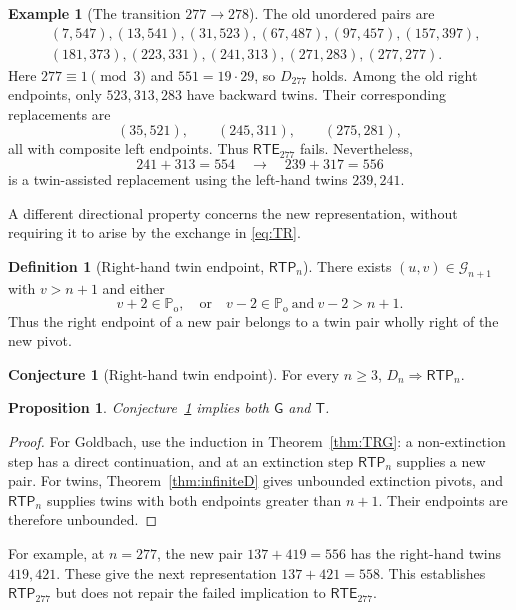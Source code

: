 \documentclass[11pt,a4paper]{article}
\newtheorem{proposition}[theorem]{Proposition}
\theoremstyle{definition}
\newtheorem{definition}[theorem]{Definition}
\newtheorem{conjecture}[theorem]{Conjecture}
\newtheorem{example}[theorem]{Example}
\theoremstyle{remark}
\newcommand{\Po}{\mathbb P_{\mathrm{o}}}
\newcommand{\G}{\mathcal G}
\newcommand{\RTE}{\mathsf{RTE}}
\newcommand{\RTP}{\mathsf{RTP}}
\newcommand{\GB}{\mathsf G}
\newcommand{\TP}{\mathsf T}
\begin{document}
\begin{example}[The transition $277\to278$]\label{ex:277}
The old unordered pairs are
\begin{align*}
 &(7,547),(13,541),(31,523),(67,487),(97,457),(157,397),\\
 &(181,373),(223,331),(241,313),(271,283),(277,277).
\end{align*}
Here $277\equiv1\pmod3$ and $551=19\cdot29$, so $D_{277}$ holds. Among the old right endpoints, only $523,313,283$ have backward twins. Their corresponding replacements are
\[
 (35,521),\qquad(245,311),\qquad(275,281),
\]
all with composite left endpoints. Thus $\RTE_{277}$ fails. Nevertheless,
\[
 241+313=554\quad\longrightarrow\quad239+317=556
\]
is a twin-assisted replacement using the left-hand twins $239,241$.
\end{example}

A different directional property concerns the new representation, without requiring it to arise by the exchange in \eqref{eq:TR}.
\begin{definition}[Right-hand twin endpoint, $\RTP_n$]
There exists $(u,v)\in\G_{n+1}$ with $v>n+1$ and either
\[
 v+2\in\Po,
 \quad\text{or}\quad
 v-2\in\Po\ \text{and}\ v-2>n+1.
\]
Thus the right endpoint of a new pair belongs to a twin pair wholly right of the new pivot.
\end{definition}

\begin{conjecture}[Right-hand twin endpoint]\label{conj:RTP}
For every $n\ge3$, $D_n\Rightarrow\RTP_n$.
\end{conjecture}

\begin{proposition}
Conjecture~\ref{conj:RTP} implies both $\GB$ and $\TP$.
\end{proposition}
\begin{proof}
For Goldbach, use the induction in Theorem~\ref{thm:TRG}: a non-extinction step has a direct continuation, and at an extinction step $\RTP_n$ supplies a new pair. For twins, Theorem~\ref{thm:infiniteD} gives unbounded extinction pivots, and $\RTP_n$ supplies twins with both endpoints greater than $n+1$. Their endpoints are therefore unbounded.
\end{proof}

For example, at $n=277$, the new pair $137+419=556$ has the right-hand twins $419,421$. These give the next representation $137+421=558$. This establishes $\RTP_{277}$ but does not repair the failed implication to $\RTE_{277}$.
\end{document}
